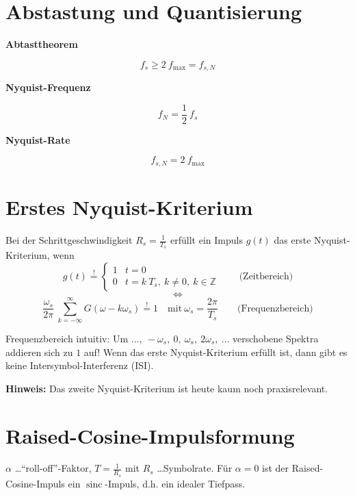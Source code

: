 \documentclass[a4paper, 11pt]{article}
\newcommand{\fancyformula}[2]{
        \small
        \raggedright{\sffamily\textbf{#1}}
        #2
}
\DeclareMathOperator{\sinc}{sinc}
\begin{document}
\section*{Abstastung und Quantisierung}
\fancyformula{Abtasttheorem}{
	\[
		f_s \geq 2 ~ f_{\mathrm{max}} = f_{s, N}
	\]
}

\fancyformula{Nyquist-Frequenz}{
	\[
		f_N = \frac{1}{2} ~ f_s
	\]
}

\fancyformula{Nyquist-Rate}{
	\[
		f_{s, N} = 2 ~ f_{\mathrm{max}}
	\]
}


\section*{Erstes Nyquist-Kriterium}
Bei der Schrittgeschwindigkeit $R_s = \frac{1}{T_s}$ erfüllt ein Impuls $g(t)$ das erste Nyquist-Kriterium, wenn
\[
	g(t) \overset{!}{=} \begin{cases}
		1 & t = 0\\
		0 & t = k ~ T_s, ~ k \neq 0, ~ k \in \mathbb Z
	\end{cases} \qquad \text{(Zeitbereich)}
\]
\[
	\Leftrightarrow
\]
\[
	\frac{\omega_s}{2 \pi} ~ \sum_{k = -\infty}^\infty G(\omega - k \omega_s) \overset{!}{=} 1 \quad \text{mit} ~ \omega_s = \frac{2 \pi}{T_s} \qquad \text{(Frequenzbereich)}
\]

Frequenzbereich intuitiv: Um $\ldots, ~ -\omega_s, ~ 0, ~ \omega_s, ~ 2 \omega_s, ~ \ldots$ verschobene Spektra addieren sich zu $1$ auf!
Wenn das erste Nyquist-Kriterium erfüllt ist, dann gibt es keine Intersymbol-Interferenz (ISI).

\textbf{Hinweis:} Das zweite Nyquist-Kriterium ist heute kaum noch praxisrelevant.

\section*{Raised-Cosine-Impulsformung}
$\alpha$ \ldots ``roll-off''-Faktor, $T = \frac{1}{R_s}$ mit $R_s$ \ldots Symbolrate. Für $\alpha = 0$ ist der Raised-Cosine-Impuls ein $\sinc$-Impuls, d.h. ein idealer Tiefpass.
\end{document}
